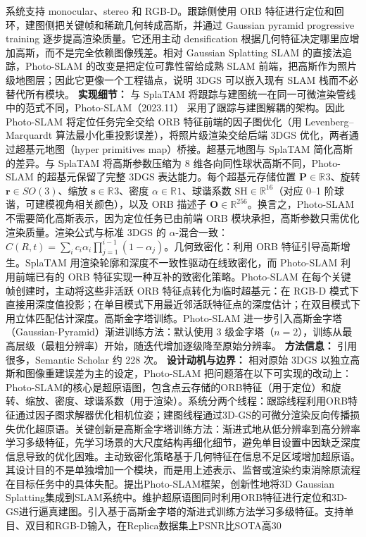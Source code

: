 系统支持 monocular、stereo 和 RGB-D。跟踪侧使用 ORB 特征进行定位和回环，建图侧把关键帧和稀疏几何转成高斯，并通过 Gaussian pyramid progressive training 逐步提高渲染质量。它还用主动 densification 根据几何特征决定哪里应增加高斯，而不是完全依赖图像残差。相对 Gaussian Splatting SLAM 的直接法追踪，Photo-SLAM 的改变是把定位可靠性留给成熟 SLAM 前端，把高斯作为照片级地图层；因此它更像一个工程锚点，说明 3DGS 可以嵌入现有 SLAM 栈而不必替代所有模块。
\textbf{实现细节：} 与 SplaTAM 将跟踪与建图统一在同一可微渲染管线中的范式不同，Photo-SLAM（2023.11） 采用了跟踪与建图解耦的架构。因此 Photo-SLAM 将定位任务完全交给 ORB 特征前端的因子图优化（用 Levenberg--Marquardt 算法最小化重投影误差），将照片级渲染交给后端 3DGS 优化，两者通过超基元地图（hyper primitives map）桥接。超基元地图与 SplaTAM 简化高斯的差异。与 SplaTAM 将高斯参数压缩为 8 维各向同性球状高斯不同，Photo-SLAM 的超基元保留了完整 3DGS 表达能力。每个超基元存储位置 $\mathbf{P} \in \mathbb{R}^{}3$、旋转 $\mathbf{r} \in SO(3)$、缩放 $\mathbf{s} \in \mathbb{R}^{}3$、密度 $\alpha \in \mathbb{R}^{}1$、球谐系数 $\mathrm{SH} \in \mathbb{R}^{16}$（对应 0--1 阶球谐，可建模视角相关颜色），以及 ORB 描述子 $\mathbf{O} \in \mathbb{R}^{256}$。换言之，Photo-SLAM 不需要简化高斯表示，因为定位任务已由前端 ORB 模块承担，高斯参数只需优化渲染质量。渲染公式与标准 3DGS 的 $\alpha$-混合一致：$C(R,t) = \sum_{i} c_i \alpha_i \prod_{j=1}^{i-1}(1-\alpha_j)$。几何致密化：利用 ORB 特征引导高斯增生。SplaTAM 用渲染轮廓和深度不一致性驱动在线致密化，而 Photo-SLAM 利用前端已有的 ORB 特征实现一种互补的致密化策略。Photo-SLAM 在每个关键帧创建时，主动将这些非活跃 ORB 特征点转化为临时超基元：在 RGB-D 模式下直接用深度值投影；在单目模式下用最近邻活跃特征点的深度估计；在双目模式下用立体匹配估计深度。高斯金字塔训练。Photo-SLAM 进一步引入高斯金字塔（Gaussian-Pyramid）渐进训练方法：默认使用 3 级金字塔（$n=2$），训练从最高层级（最粗分辨率）开始，随迭代增加逐级降至原始分辨率。
\textbf{方法信息：} 引用很多，Semantic Scholar 约 228 次。
\textbf{设计动机与边界：} 相对原始 3DGS 以独立高斯和图像重建误差为主的设定，Photo-SLAM 把问题落在以下可实现的改动上：Photo-SLAM的核心是超原语图，包含点云存储的ORB特征（用于定位）和旋转、缩放、密度、球谐系数（用于渲染）。系统分两个线程：跟踪线程利用ORB特征通过因子图求解器优化相机位姿；建图线程通过3D-GS的可微分渲染反向传播损失优化超原语。关键创新是高斯金字塔训练方法：渐进式地从低分辨率到高分辨率学习多级特征，先学习场景的大尺度结构再细化细节，避免单目设置中因缺乏深度信息导致的优化困难。主动致密化策略基于几何特征在信息不足区域增加超原语。其设计目的不是单独增加一个模块，而是用上述表示、监督或渲染约束消除原流程在目标任务中的具体失配。提出Photo-SLAM框架，创新性地将3D Gaussian Splatting集成到SLAM系统中。维护超原语图同时利用ORB特征进行定位和3D-GS进行逼真建图。引入基于高斯金字塔的渐进式训练方法学习多级特征。支持单目、双目和RGB-D输入，在Replica数据集上PSNR比SOTA高30%
